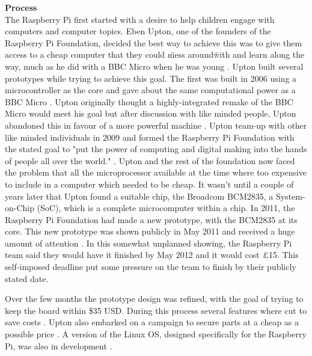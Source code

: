 \textbf{Process}\\
The Raspberry Pi first started with a desire to help children engage with computers and computer topics. Eben Upton, one of the founders of the Raspberry Pi Foundation, decided the best way to achieve this was to give them access to a cheap computer that they could \"mess around\" with and learn along the way, much as he did with a BBC Micro when he was young 
\cite{RN98}. Upton built several prototypes while trying to achieve this goal. The first was built in 2006 using a microcontroller as the core and gave about the same computational power as a BBC Micro 
\cite{RN137}. Upton originally thought a highly-integrated remake of the BBC Micro would meet his goal but after discussion with like minded people, Upton abandoned this in favour of a more powerful machine 
\cite{RN98}. Upton team-up with other like minded individuals in 2009 and formed the Raspberry Pi Foundation with the stated goal to "put the power of computing and digital making into the hands of people all over the world." 
\cite{RN138}. Upton and the rest of the foundation now faced the problem that all the microprocessor available at the time where too expensive to include in a computer which needed to be cheap. It wasn't until a couple of years later that Upton found a suitable chip, the Broadcom BCM2835, a System-on-Chip (SoC), which is a complete microcomputer within a chip. In 2011, the Raspberry Pi Foundation had made a new prototype, with the BCM2835 at its core. This new prototype was shown publicly in May 2011 and received a huge amount of attention 
\cite{RN140}. In this somewhat unplanned showing, the Raspberry Pi team said they would have it finished by May 2012 and it would cost \pounds 15. This self-imposed deadline put some pressure on the team to finish by their publicly stated date.  

Over the few months the prototype design was refined, with the goal of trying to keep the board within \$35 USD. During this process several features where cut to save costs 
\cite{RN98}. Upton also embarked on a campaign to secure parts at a cheap as a possible price 
\cite{RN98}. A version of the Linux OS, designed specifically for the Raspberry Pi, was also in development 
\cite{RN98}.

